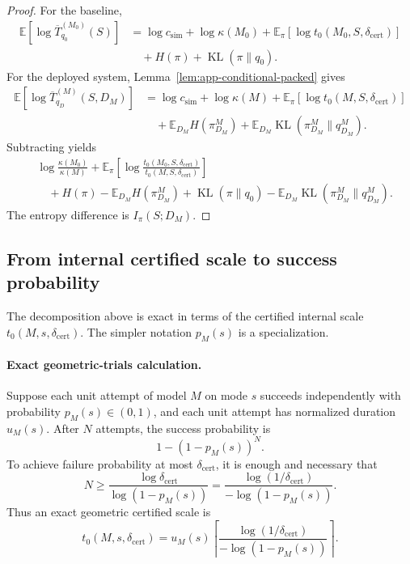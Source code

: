 \documentclass{article}
\DeclareMathOperator{\KL}{KL}
\newcommand{\E}{\mathbb{E}}
\begin{document}
\begin{proof}
For the baseline,
\[
\begin{aligned}
    \E[\log \overline T^{(M_0)}_{q_0}(S)]
    &=
    \log c_{\mathrm{sim}}
    +
    \log\kappa(M_0)
    +
    \E_\pi[\log t_0(M_0,S,\delta_{\mathrm{cert}})]
    \\
    &\quad
    +
    H(\pi)
    +
    \KL(\pi\|q_0).
\end{aligned}
\]
For the deployed system, Lemma~\ref{lem:app-conditional-packed} gives
\[
\begin{aligned}
    \E[\log \overline T^{(M)}_{q_D}(S,D_M)]
    &=
    \log c_{\mathrm{sim}}
    +
    \log\kappa(M)
    +
    \E_\pi[\log t_0(M,S,\delta_{\mathrm{cert}})]
    \\
    &\quad
    +
    \E_{D_M}H(\pi_{D_M}^M)
    +
    \E_{D_M}\KL(\pi_{D_M}^M\|q_{D_M}^M).
\end{aligned}
\]
Subtracting yields
\[
\begin{aligned}
&\log\frac{\kappa(M_0)}{\kappa(M)}
+
\E_\pi
\left[
    \log\frac{t_0(M_0,S,\delta_{\mathrm{cert}})}
              {t_0(M,S,\delta_{\mathrm{cert}})}
\right]
\\
&\quad+
H(\pi)-\E_{D_M}H(\pi_{D_M}^M)
+
\KL(\pi\|q_0)
-
\E_{D_M}\KL(\pi_{D_M}^M\|q_{D_M}^M).
\end{aligned}
\]
The entropy difference is \(I_\pi(S;D_M)\).
\end{proof}

\subsection{From internal certified scale to success probability}

The decomposition above is exact in terms of the certified internal scale
\(t_0(M,s,\delta_{\mathrm{cert}})\).
The simpler notation \(p_M(s)\) is a specialization.

\paragraph{Exact geometric-trials calculation.}
Suppose each unit attempt of model \(M\) on mode \(s\) succeeds independently with
probability \(p_M(s)\in(0,1)\), and each unit attempt has normalized duration \(u_M(s)\).
After \(N\) attempts, the success probability is
\[
    1-(1-p_M(s))^N.
\]
To achieve failure probability at most \(\delta_{\mathrm{cert}}\), it is enough and necessary that
\[
    N
    \ge
    \frac{\log \delta_{\mathrm{cert}}}{\log(1-p_M(s))}
    =
    \frac{\log(1/\delta_{\mathrm{cert}})}
         {-\log(1-p_M(s))}.
\]
Thus an exact geometric certified scale is
\[
    t_0(M,s,\delta_{\mathrm{cert}})
    =
    u_M(s)
    \left\lceil
    \frac{\log(1/\delta_{\mathrm{cert}})}
         {-\log(1-p_M(s))}
    \right\rceil .
\]
\end{document}
